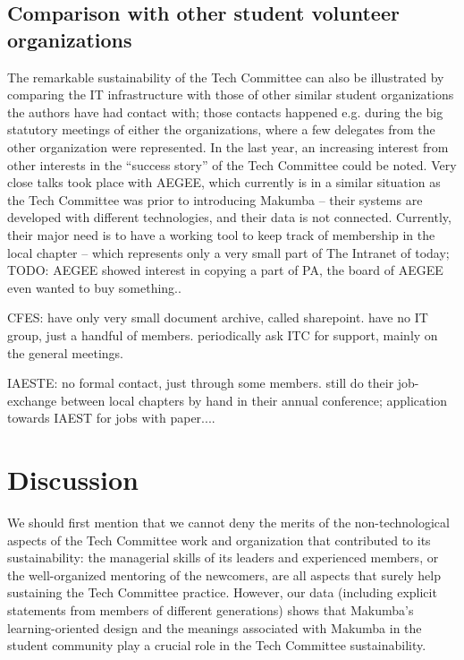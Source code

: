 \documentclass{acm_proc_article-sp}
\begin{document}
\subsection{Comparison with other student volunteer organizations}
The remarkable sustainability of the Tech Committee can also be illustrated by comparing the IT infrastructure with those of other similar student organizations the authors have had contact with; those contacts happened e.g. during the big statutory meetings of either the organizations, where a few delegates from the other organization were represented. In the last year, an increasing interest from other interests in the ``success story'' of the Tech Committee could be noted. Very close talks took place with AEGEE, which currently is in a similar situation as the Tech Committee was prior to introducing Makumba -- their systems are developed with different technologies, and their data is not connected. Currently, their major need is to have a working tool to keep track of membership in the local chapter -- which represents only a very small part of The Intranet of today;
TODO: AEGEE showed interest in copying a part of PA, the board of AEGEE even wanted to buy something..

CFES: have only very small document archive, called sharepoint. have no IT group, just a handful of members. periodically ask ITC for support, mainly on the general meetings.

IAESTE: no formal contact, just through some members. still do their job-exchange between local chapters by hand in their annual conference; application towards IAEST for  jobs with paper....


\section{Discussion}\label{sec:disco}
We should first mention that we cannot deny the merits of the non-technological aspects of the Tech Committee work and organization that contributed to its sustainability: the managerial skills of its leaders and experienced members, or the well-organized mentoring of the newcomers, are all aspects that surely help sustaining the Tech Committee practice. However, our data (including explicit statements from members of different generations) shows that Makumba's learning-oriented design and the meanings associated with Makumba in the student community play a crucial role in the Tech Committee sustainability.
\end{document}
